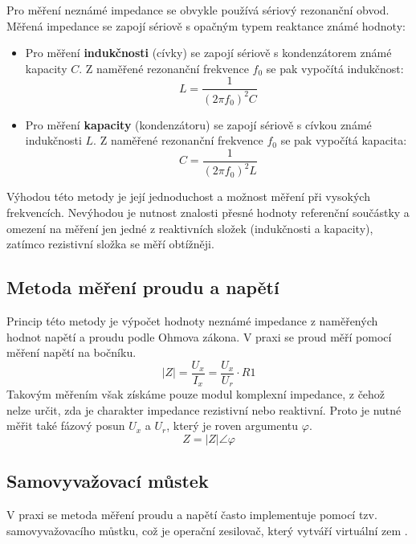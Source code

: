 Pro měření neznámé impedance se obvykle používá sériový rezonanční obvod. Měřená impedance se zapojí sériově s opačným typem reaktance známé hodnoty:
\begin{itemize}
    \item Pro měření \textbf{indukčnosti} (cívky) se zapojí sériově s kondenzátorem známé kapacity $C$. Z naměřené rezonanční frekvence $f_0$ se pak vypočítá indukčnost:
    \begin{equation}
    L = \frac{1}{(2\pi f_0)^2 C}
    \end{equation}
    \item Pro měření \textbf{kapacity} (kondenzátoru) se zapojí sériově s cívkou známé indukčnosti $L$. Z naměřené rezonanční frekvence $f_0$ se pak vypočítá kapacita:
    \begin{equation}
    C = \frac{1}{(2\pi f_0)^2 L}
    \end{equation}
\end{itemize}

Výhodou této metody je její jednoduchost a možnost měření při vysokých frekvencích. Nevýhodou je nutnost znalosti přesné hodnoty referenční součástky a omezení na měření jen jedné z reaktivních složek (indukčnosti a kapacity), zatímco rezistivní složka se měří obtížněji.

\subsection{Metoda měření proudu a napětí}
Princip této metody je výpočet hodnoty neznámé impedance z naměřených hodnot napětí a proudu podle Ohmova zákona. \cite{KeysightImpedanceHandbook}
V praxi se proud měří pomocí měření napětí na bočníku.
\begin{equation}
|Z| = \frac{U_{x}}{I_{x}} = \frac{U_{x}}{U_{r}}\cdot R1
\end{equation}
Takovým měřením však získáme pouze modul komplexní impedance, z čehož nelze určit, 
zda je charakter impedance rezistivní nebo reaktivní.
Proto je nutné měřit také fázový posun $U_{x}$ a $U_{r}$, který je roven argumentu $\varphi$.
\begin{equation}
 Z = |Z| \angle \varphi
\end{equation}

\subsection{Samovyvažovací můstek}
V praxi se metoda měření proudu a napětí často implementuje pomocí tzv. samovyvažovacího můstku,
což je operační zesilovač, který vytváří virtuální zem . \cite{KeysightImpedanceHandbook}

